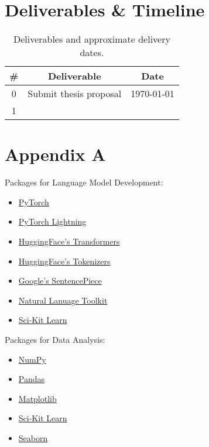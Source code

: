 \documentclass[10pt]{article}
\begin{document}
    \section{Deliverables \& Timeline}
        \begin{table}[h!]
            \centering
            \begin{tabular}{|c|c|c|}
                \hline
                \# & Deliverable & Date\\
                \hline
                0 & Submit thesis proposal & \today\\
                1 & & \\
                \hline
            \end{tabular}
            \label{table:timeline}
            \caption{Deliverables and approximate delivery dates.}
        \end{table}

    \newpage
    \section{Appendix A}
        Packages for Language Model Development:
        \begin{multicols}{2}
            \begin{itemize}
                \item \href{https://pytorch.org}{PyTorch}
                \item \href{https://www.pytorchlightning.ai}{PyTorch Lightning}
                \item \href{https://github.com/huggingface/transformers}{HuggingFace's Transformers}
                \item \href{https://github.com/huggingface/tokenizers}{HuggingFace's Tokenizers}
                \item \href{https://github.com/google/sentencepiece}{Google's SentencePiece}
                \item \href{https://www.nltk.org}{Natural Lanuage Toolkit}
                \item \href{https://scikit-learn.org}{Sci-Kit Learn}
            \end{itemize}
        \end{multicols}

        Packages for Data Analysis:
        \begin{itemize}
            \item \href{https://numpy.org}{NumPy}
            \item \href{https://pandas.pydata.org}{Pandas}
            \item \href{https://matplotlib.org}{Matplotlib}
            \item \href{https://scikit-learn.org}{Sci-Kit Learn}
            \item \href{https://seaborn.pydata.org}{Seaborn}
        \end{itemize}

    \newpage
    
    
\end{document}
